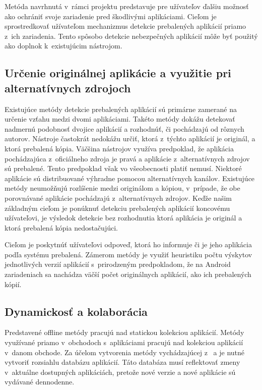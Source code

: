Metóda navrhnutá v~rámci projektu  predstavuje pre užívateľov ďalšiu možnosť ako ochrániť svoje zariadenie pred škodlivými aplikáciami. Cieľom je sprostredkovať užívateľom mechanizmus detekcie prebalených aplikácií priamo z~ich zariadenia. Tento spôsobo detekcie nebezpečných aplikácií môže byť použitý ako doplnok k~existujúcim nástrojom.


\subsection*{Určenie originálnej aplikácie a využitie pri alternatívnych zdrojoch}

Existujúce metódy detekcie prebalených aplikácií sú primárne zamerané na určenie vzťahu medzi dvomi aplikáciami. Takéto metódy dokážu detekovať nadmernú podobnosť dvojice aplikácií a rozhodnúť, či pochádzajú od rôznych autorov. Nástroje častokrát nedokážu určiť, ktorá z~týchto aplikácií je originál, a ktorá prebalená kópia. Väčšina nástrojov využíva predpoklad, že aplikácia pochádzajúca z~oficiálneho zdroja  je pravá a aplikácie z~alternatívnych zdrojov sú prebalené. Tento predpoklad však vo všeobecnosti platiť nemusí. Niektoré aplikácie sú distribuované výhradne pomocou alternatívnych kanálov. Existujúce metódy neumožňujú rozlíšenie medzi originálom a kópiou, v~prípade, že obe porovnávané aplikácie pochádzajú z~alternatívnych zdrojov. Keďže našim základným cieľom je ponúknuť detekciu prebalených aplikácií koncovému užívateľovi, je výsledok detekcie bez rozhodnutia ktorá aplikácia je originál a ktorá prebalená kópia nedostačujúci. 


Cieľom je poskytnúť užívateľovi odpoveď, ktorá ho informuje či je jeho aplikácia podľa systému  prebalená. 
Zámerom metódy  je využiť heuristiku počtu výskytov jednotlivých verzií aplikácií s~prirodzeným predpokladom, že na Android zariadeniach sa nachádza väčší počet originálnych aplikácií, ako ich prebalených kópií. 

\subsection*{Dynamickosť a kolaborácia}
Predstavené offline metódy pracujú nad statickou kolekciou aplikácií. Metódy využívané priamo v~obchodoch s~aplikáciami pracujú nad kolekciou aplikácií v~danom obchode. Za účelom vytvorenia metódy vychádzajúcej z~ a  je nutné vytvoriť rozsiahlu databázu aplikácií. Táto databáza musí reflektovať zmeny v~aktuálne dostupných aplikáciách, pretože nové verzie a nové aplikácie sú vydávané dennodenne. 



